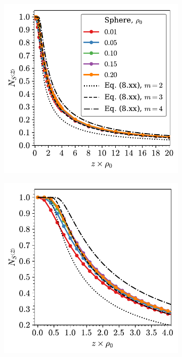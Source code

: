\begin{figure}

	\begin{subfigure}[b]{0.48\textwidth}
         \centering
         \includegraphics[width=\textwidth]{./figures/quasi2d/n_z_3d_sphere1.pdf}
         \caption{}
         \label{fig:nphia}
     \end{subfigure}
     \hfill
      \begin{subfigure}[b]{0.48\textwidth}
         \centering
         \includegraphics[width=\textwidth]{./figures/quasi2d/n_z_3d_sphere2.pdf}
         \caption{}
         \label{fig:nphib}
     \end{subfigure}
     \hfill
     

\end{figure}
